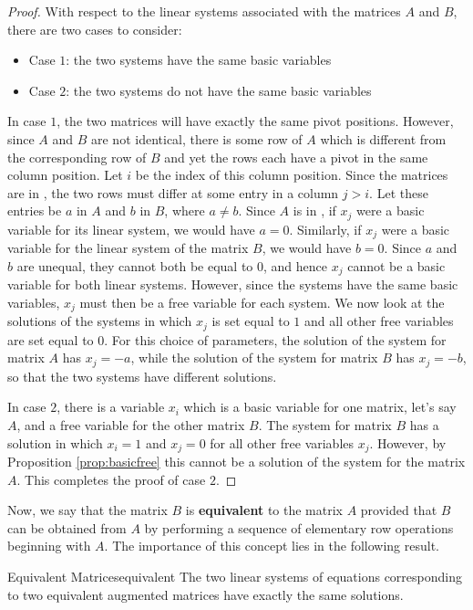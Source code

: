 \begin{proof}
With respect to the linear systems associated with the matrices $A$ and $B$, there are two cases to consider:
\begin{itemize}
\item Case $1$: the two systems have the same basic variables
\item Case $2$: the two systems do not have the same basic variables
\end{itemize}
In case $1$, the two matrices will have exactly the same pivot positions. However, since $A$ and $B$ are not identical, there is some row of $A$ which is different from the corresponding row of $B$ and yet the rows each have a pivot in the same column position. Let $i$ be the index of this column position. Since the matrices are in \rref, the two rows must differ at some entry in a column $j>i$. Let these entries be $a$ in $A$ and $b$ in $B$, where $a \neq b$. Since $A$ is in \rref, if $x_j$ were a basic variable for its linear system, we would have $a=0$. Similarly, if $x_j$ were a basic variable for the linear system of the matrix $B$, we would have $b=0$. Since $a$ and $b$ are unequal, they cannot both be equal to $0$, and hence $x_j$ cannot be a basic variable for both linear systems. However, since the systems have the same basic variables, $x_j$ must then be a free variable for each system. We now look at the solutions of the systems in which $x_j$ is set equal to $1$ and all other free variables are set equal to $0$. For this choice of parameters, the solution of the system for matrix $A$ has $x_j=-a$, while the solution of the system for matrix $B$ has $x_j=-b$, so that the two systems have different solutions.

In case $2$, there is a variable $x_i$ which is a basic variable for one matrix, let's say $A$, and a free variable for the other matrix $B$. The system for matrix $B$ has a solution in which $x_i=1$ and $x_j=0$ for all other free variables $x_j$. However, by Proposition \ref{prop:basicfree} this cannot be a solution of the system for the matrix $A$. This completes the proof of case $2$.
\end{proof}

Now, we say that the matrix $B$ is \textbf{equivalent}  to the matrix $A$ provided that $B$ can be obtained from $A$ by performing a sequence of elementary row operations beginning with $A$. The importance of this concept lies in the following result.

\begin{theorem}{Equivalent Matrices}{equivalent}
The two linear systems of equations corresponding to two equivalent augmented matrices have exactly the same solutions.
\end{theorem}

